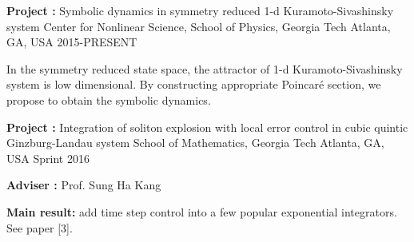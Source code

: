 \begin{cventries}
\cventry
{\textbf{Project :} Symbolic dynamics in symmetry reduced 1-d Kuramoto-Sivashinsky system} 
{Center for Nonlinear Science, School of Physics, Georgia Tech} 
{Atlanta, GA, USA} %
{2015-PRESENT} %
{
  \begin{cvitems}
      \item {In the symmetry reduced state space, the attractor of  1-d Kuramoto-Sivashinsky system
          is low dimensional. By constructing appropriate Poincar\'e section, we propose to obtain the
          symbolic dynamics. }
  \end{cvitems}
}


\cventry
{\textbf{Project :} Integration of soliton explosion with local error control in cubic quintic 
  Ginzburg-Landau system} 
{School of Mathematics, Georgia Tech} 
{Atlanta, GA, USA} %
{Sprint 2016} %
{
  \begin{cvitems}
  \item {\textbf{Adviser :} Prof. Sung Ha Kang}
  \item {\textbf{Main result:}  add time step control into a few popular exponential integrators. See paper [3].}
  \end{cvitems}
}







\end{cventries}